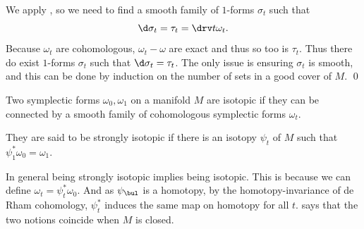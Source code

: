 \ethrm

\bproof

    We apply , so we need to find a smooth family of $1$-forms $\sigma_t$ such that
    $$ \d\sigma_t = \tau_t = \drv t\omega_t . $$
    Because $\omega_t$ are cohomologous, $\omega_t-\omega$ are exact and thus so too is $\tau_t$.
    Thus there do exist $1$-forms $\sigma_t$ such that $\d\sigma_t=\tau_t$.
    The only issue is ensuring $\sigma_t$ is smooth, and this can be done by induction on the number of sets in a good cover of $M$.
    \qed

\eproof

\bdefn

    Two symplectic forms $\omega_0,\omega_1$ on a manifold $M$ are {\emphcolor isotopic} if they can be connected by a smooth family
    of cohomologous symplectic forms $\omega_t$.

    They are said to be {\emphcolor strongly isotopic} if there is an isotopy $\psi_t$ of $M$ such that $\psi_1^*\omega_0=\omega_1$.

\edefn

In general being strongly isotopic implies being isotopic.
This is because we can define $\omega_t=\psi_t^*\omega_0$.
And as $\psi_\bul$ is a homotopy, by the homotopy-invariance of de Rham cohomology, $\psi_t^*$ induces the same map on homotopy for all $t$.
 says that the two notions coincide when $M$ is closed.

